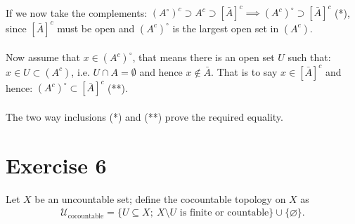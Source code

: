 \documentclass[12pt]{article}
\begin{document}
\\
If we now take the complements: $(A^\circ)^c \supset A^c \supset [\bar{A}]^c \implies (A^c)^\circ \supset [\bar{A}]^c$ (*), since $[\bar{A}]^c$ must be open
and $(A^c)^\circ$ is the largest open set in $(A^c)$.\\
\\
Now assume that $x \in (A^c)^\circ$, that means there is an open set $U$ such that: $x \in U \subset (A^c)$, i.e. $U \cap A = \emptyset$ and hence $x \notin \bar{A}$.
That is to say $x \in [\bar{A}]^c$ and hence: $(A^c)^\circ \subset [\bar{A}]^c$ (**).\\
\\
The two way inclusions (*) and (**) prove the required equality.



\newpage
\noindent
\section*{Exercise 6}
Let \(X\) be an uncountable set; define the
cocountable topology on \(X\) as
\begin{align*}
\mathcal{U}_{\mathrm{cocountable}}
=\{U\subseteq X;\ X\setminus U\text{ is finite or countable}\}
\cup\{\varnothing\}.
\end{align*}
\end{document}

